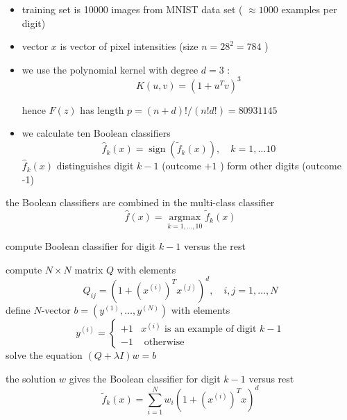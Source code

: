 \begin{itemize}
    \item training set is 10000 images from MNIST data set ( $ \approx 1000 $ examples per digit)
    \item vector $ x $ is vector of pixel intensities (size $ n=28^{2}=784 $ )
    \item we use the polynomial kernel with degree $ d=3 $ :
\begin{equation}
K(u, v)=\left(1+u^{T} v\right)^{3}
\end{equation}

hence $ F(z) $ has length $ p=(n+d) ! /(n ! d !)=80931145 $

    \item we calculate ten Boolean classifiers
\begin{equation}
\hat{f}_{k}(x)=\operatorname{sign}\left(\tilde{f}_{k}(x)\right), \quad k=1, \ldots 10
\end{equation}
$ \hat{f}_{k}(x) $ distinguishes digit $ k-1 $ (outcome $ +1 $ ) form other digits (outcome -1)


\end{itemize}


the Boolean classifiers are combined in the multi-class classifier
\begin{equation}
\hat{f}(x)=\underset{k=1, \ldots, 10}{\operatorname{argmax}} \tilde{f}_{k}(x)
\end{equation}


\begin{algorithm}[htbp]
    \caption{compute Boolean classifier for digit $ k-1 $ versus the rest}
    compute $ N \times N $ matrix $ Q $ with elements
    \begin{equation}
    Q_{i j}=\left(1+\left(x^{(i)}\right)^{T} x^{(j)}\right)^{d}, \quad i, j=1, \ldots, N
    \end{equation}\;
    define $ N $-vector $ b=\left(y^{(1)}, \ldots, y^{(N)}\right) $ with elements
    \begin{equation}
    y^{(i)}=\left\{\begin{array}{ll}
    +1 & x^{(i)} \text { is an example of digit } k-1 \\
    -1 & \text { otherwise }
    \end{array}\right.
    \end{equation}\;
    solve the equation $ (Q+\lambda I) w=b $

\end{algorithm}

the solution $ w $ gives the Boolean classifier for digit $ k-1 $ versus rest
\begin{equation}
\tilde{f}_{k}(x)=\sum_{i=1}^{N} w_{i}\left(1+\left(x^{(i)}\right)^{T} x\right)^{d}
\end{equation}



